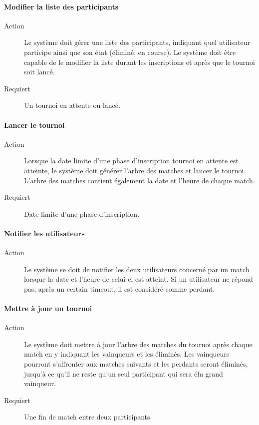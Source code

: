 \documentclass[a4paper]{article}
\begin{document}
\paragraph{Modifier la liste des participants}
\begin{description}
\item[Action] Le système doit gérer une liste des participants, indiquant quel \gls{utilisateur} participe ainsi que son état (éliminé, en course). Le système doit être capable de le modifier la liste durant les inscriptions et après que le tournoi soit lancé.
\item[Requiert] Un tournoi en attente ou lancé.
\end{description}

\paragraph{Lancer le tournoi}
\begin{description}
\item[Action] Lorsque la date limite d'une phase d'inscription tournoi en attente est atteinte, le système doit générer l'arbre des matches et lancer le tournoi. L'arbre des matches contient également la date et l'heure de chaque match.
\item[Requiert] Date limite d'une phase d'inscription.
\end{description}

\paragraph{Notifier les utilisateurs}
\begin{description}
\item[Action] Le système se doit de notifier les deux \glspl{utilisateur} concerné par un match lorsque la date et l'heure de celui-ci est atteint. Si un \gls{utilisateur} ne répond pas, après un certain timeout, il est considéré comme perdant.
\end{description}

\paragraph{Mettre à jour un tournoi}
\begin{description}
\item[Action] Le système doit mettre à jour l'arbre des matches du tournoi après chaque match en y indiquant les vainqueurs et les éliminés. Les vainqueurs pourront s'affronter aux matches suivants et les perdants seront éliminés, jusqu'à ce qu'il ne reste qu'un seul participant qui sera élu grand vainqueur.
\item[Requiert] Une fin de match entre deux participants.
\end{description}
\end{document}
